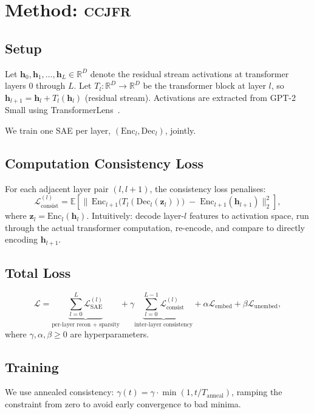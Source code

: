 \documentclass[12pt,a4paper]{article}
\newcommand{\RR}{\mathbb{R}}
\newcommand{\EE}{\mathbb{E}}
\newcommand{\calL}{\mathcal{L}}
\newcommand{\bz}{\mathbf{z}}
\newcommand{\bh}{\mathbf{h}}
\newcommand{\Enc}{\mathrm{Enc}}
\newcommand{\Dec}{\mathrm{Dec}}
\newcommand{\CCJFR}{\textsc{ccjfr}}
\begin{document}
\section{Method: \CCJFR{}}
\label{sec:method}

\subsection{Setup}

Let $\bh_0, \bh_1, \ldots, \bh_L \in \RR^D$ denote the residual stream
activations at transformer layers $0$ through $L$.
Let $T_l : \RR^D \to \RR^D$ be the transformer block at layer $l$, so
$\bh_{l+1} = \bh_l + T_l(\bh_l)$ (residual stream).
Activations are extracted from GPT-2 Small using TransformerLens~\citep{nanda2022transformerlens}.

We train one SAE per layer, $(\Enc_l, \Dec_l)$, jointly.

\subsection{Computation Consistency Loss}

For each adjacent layer pair $(l, l+1)$, the consistency loss penalises:
\[
  \calL_{\mathrm{consist}}^{(l)} =
  \EE\left[\bigl\|\,
    \Enc_{l+1}\bigl(T_l(\Dec_l(\bz_l))\bigr)
    \;-\;
    \Enc_{l+1}(\bh_{l+1})
  \bigr\|_2^2\right],
\]
where $\bz_l = \Enc_l(\bh_l)$.
Intuitively: decode layer-$l$ features to activation space, run through the
actual transformer computation, re-encode, and compare to directly encoding
$\bh_{l+1}$.

\subsection{Total Loss}

\[
  \calL = \underbrace{\sum_{l=0}^{L} \calL_{\mathrm{SAE}}^{(l)}}_{\text{per-layer recon + sparsity}}
  + \gamma \underbrace{\sum_{l=0}^{L-1} \calL_{\mathrm{consist}}^{(l)}}_{\text{inter-layer consistency}}
  + \alpha \calL_{\mathrm{embed}}
  + \beta \calL_{\mathrm{unembed}},
\]
where $\gamma, \alpha, \beta \geq 0$ are hyperparameters.

\subsection{Training}

We use annealed consistency: $\gamma(t) = \gamma \cdot \min(1, t/T_{\mathrm{anneal}})$,
ramping the constraint from zero to avoid early convergence to bad minima.
\end{document}
